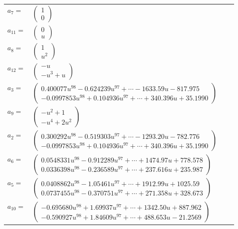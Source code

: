 \documentclass[1p]{elsarticle_modified}
\theoremstyle{definition}
\begin{document}
\begin{tabular}{m{7pt} m{180pt} m{7pt} m{180pt} }
\flushright $a_{7}=$&$\begin{pmatrix}1\\0\end{pmatrix}$ \\
\flushright $a_{11}=$&$\begin{pmatrix}0\\u\end{pmatrix}$ \\
\flushright $a_{8}=$&$\begin{pmatrix}1\\u^2\end{pmatrix}$ \\
\flushright $a_{12}=$&$\begin{pmatrix}- u\\- u^3+u\end{pmatrix}$ \\
\flushright $a_{3}=$&$\begin{pmatrix}0.400077 u^{98}-0.624239 u^{97}+\cdots-1633.59 u-817.975\\-0.0997853 u^{98}+0.104936 u^{97}+\cdots+340.396 u+35.1990\end{pmatrix}$ \\
\flushright $a_{9}=$&$\begin{pmatrix}- u^2+1\\- u^4+2 u^2\end{pmatrix}$ \\
\flushright $a_{2}=$&$\begin{pmatrix}0.300292 u^{98}-0.519303 u^{97}+\cdots-1293.20 u-782.776\\-0.0997853 u^{98}+0.104936 u^{97}+\cdots+340.396 u+35.1990\end{pmatrix}$ \\
\flushright $a_{6}=$&$\begin{pmatrix}0.0548331 u^{98}-0.912289 u^{97}+\cdots+1474.97 u+778.578\\0.0336398 u^{98}-0.236589 u^{97}+\cdots+237.616 u+235.987\end{pmatrix}$ \\
\flushright $a_{5}=$&$\begin{pmatrix}0.0408862 u^{98}-1.05461 u^{97}+\cdots+1912.99 u+1025.59\\0.0737455 u^{98}-0.370751 u^{97}+\cdots+271.358 u+328.673\end{pmatrix}$ \\
\flushright $a_{10}=$&$\begin{pmatrix}-0.695680 u^{98}+1.69937 u^{97}+\cdots+1342.50 u+887.962\\-0.590927 u^{98}+1.84609 u^{97}+\cdots+488.653 u-21.2569\end{pmatrix}$ \\

\end{tabular}
\end{document}
